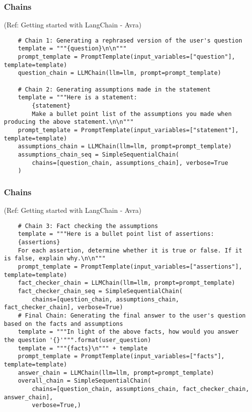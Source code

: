 \begin{frame}[fragile] \frametitle{Chains}

{\tiny (Ref: Getting started with LangChain - Avra)}


\begin{lstlisting}
    # Chain 1: Generating a rephrased version of the user's question
    template = """{question}\n\n"""
    prompt_template = PromptTemplate(input_variables=["question"], template=template)
    question_chain = LLMChain(llm=llm, prompt=prompt_template)

    # Chain 2: Generating assumptions made in the statement
    template = """Here is a statement:
        {statement}
        Make a bullet point list of the assumptions you made when producing the above statement.\n\n"""
    prompt_template = PromptTemplate(input_variables=["statement"], template=template)
    assumptions_chain = LLMChain(llm=llm, prompt=prompt_template)
    assumptions_chain_seq = SimpleSequentialChain(
        chains=[question_chain, assumptions_chain], verbose=True
    )

\end{lstlisting}

\end{frame}

\begin{frame}[fragile] \frametitle{Chains}

{\tiny (Ref: Getting started with LangChain - Avra)}


\begin{lstlisting}
    # Chain 3: Fact checking the assumptions
    template = """Here is a bullet point list of assertions:
    {assertions}
    For each assertion, determine whether it is true or false. If it is false, explain why.\n\n"""
    prompt_template = PromptTemplate(input_variables=["assertions"], template=template)
    fact_checker_chain = LLMChain(llm=llm, prompt=prompt_template)
    fact_checker_chain_seq = SimpleSequentialChain(
        chains=[question_chain, assumptions_chain, fact_checker_chain], verbose=True)
    # Final Chain: Generating the final answer to the user's question based on the facts and assumptions
    template = """In light of the above facts, how would you answer the question '{}'""".format(user_question)
    template = """{facts}\n""" + template
    prompt_template = PromptTemplate(input_variables=["facts"], template=template)
    answer_chain = LLMChain(llm=llm, prompt=prompt_template)
    overall_chain = SimpleSequentialChain(
        chains=[question_chain, assumptions_chain, fact_checker_chain, answer_chain],
        verbose=True,)
\end{lstlisting}


\end{frame}

